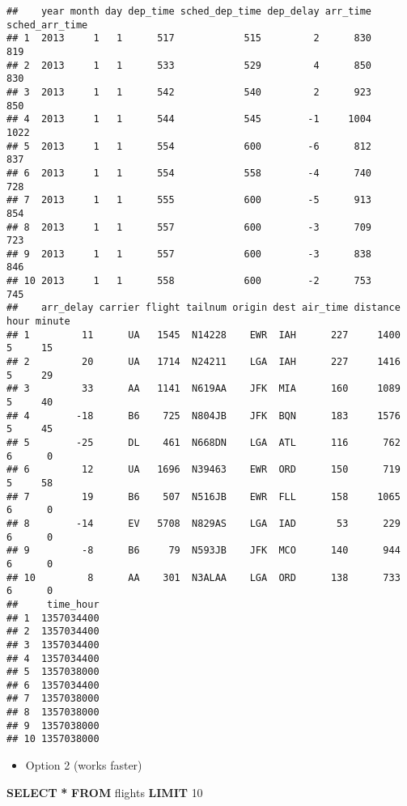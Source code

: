 \documentclass[
]{book}
\newenvironment{Shaded}{\begin{snugshade}}{\end{snugshade}}
\newcommand{\DecValTok}[1]{\textcolor[rgb]{0.00,0.00,0.81}{#1}}
\newcommand{\KeywordTok}[1]{\textcolor[rgb]{0.13,0.29,0.53}{\textbf{#1}}}
\newcommand{\NormalTok}[1]{#1}
\newcommand{\OperatorTok}[1]{\textcolor[rgb]{0.81,0.36,0.00}{\textbf{#1}}}
\providecommand{\tightlist}{%
  \setlength{\itemsep}{0pt}\setlength{\parskip}{0pt}}
\begin{document}
\begin{verbatim}
##    year month day dep_time sched_dep_time dep_delay arr_time sched_arr_time
## 1  2013     1   1      517            515         2      830            819
## 2  2013     1   1      533            529         4      850            830
## 3  2013     1   1      542            540         2      923            850
## 4  2013     1   1      544            545        -1     1004           1022
## 5  2013     1   1      554            600        -6      812            837
## 6  2013     1   1      554            558        -4      740            728
## 7  2013     1   1      555            600        -5      913            854
## 8  2013     1   1      557            600        -3      709            723
## 9  2013     1   1      557            600        -3      838            846
## 10 2013     1   1      558            600        -2      753            745
##    arr_delay carrier flight tailnum origin dest air_time distance hour minute
## 1         11      UA   1545  N14228    EWR  IAH      227     1400    5     15
## 2         20      UA   1714  N24211    LGA  IAH      227     1416    5     29
## 3         33      AA   1141  N619AA    JFK  MIA      160     1089    5     40
## 4        -18      B6    725  N804JB    JFK  BQN      183     1576    5     45
## 5        -25      DL    461  N668DN    LGA  ATL      116      762    6      0
## 6         12      UA   1696  N39463    EWR  ORD      150      719    5     58
## 7         19      B6    507  N516JB    EWR  FLL      158     1065    6      0
## 8        -14      EV   5708  N829AS    LGA  IAD       53      229    6      0
## 9         -8      B6     79  N593JB    JFK  MCO      140      944    6      0
## 10         8      AA    301  N3ALAA    LGA  ORD      138      733    6      0
##     time_hour
## 1  1357034400
## 2  1357034400
## 3  1357034400
## 4  1357034400
## 5  1357038000
## 6  1357034400
## 7  1357038000
## 8  1357038000
## 9  1357038000
## 10 1357038000
\end{verbatim}

\begin{itemize}
\tightlist
\item
  Option 2 (works faster)
\end{itemize}

\begin{Shaded}
\begin{Highlighting}[]

\KeywordTok{SELECT} \OperatorTok{*} 
\KeywordTok{FROM}\NormalTok{ flights }
\KeywordTok{LIMIT} \DecValTok{10}
\end{Highlighting}
\end{Shaded}
\end{document}
